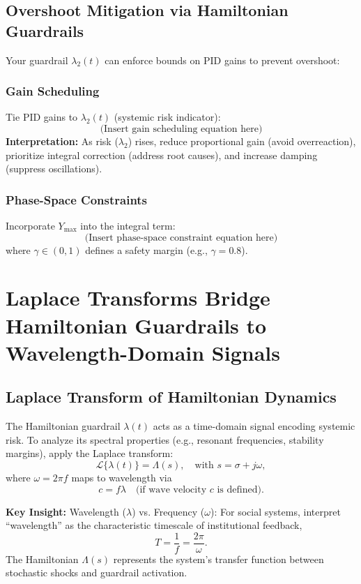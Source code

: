 \documentclass{article}
\theoremstyle{definition}
\begin{document}
\subsection{Overshoot Mitigation via Hamiltonian Guardrails}
Your guardrail $\lambda_2(t)$ can enforce bounds on PID gains to prevent overshoot:

\subsubsection{Gain Scheduling}
Tie PID gains to $\lambda_2(t)$ (systemic risk indicator):
\[
\text{(Insert gain scheduling equation here)}
\]
\textbf{Interpretation:} As risk ($\lambda_2$) rises, reduce proportional gain (avoid overreaction), prioritize integral correction (address root causes), and increase damping (suppress oscillations).

\subsubsection{Phase-Space Constraints}
Incorporate $Y_{\text{max}}$ into the integral term:
\[
\text{(Insert phase-space constraint equation here)}
\]
where $\gamma \in (0,1)$ defines a safety margin (e.g., $\gamma = 0.8$).


\section{Laplace Transforms Bridge Hamiltonian Guardrails to Wavelength-Domain Signals}

\subsection{Laplace Transform of Hamiltonian Dynamics}
The Hamiltonian guardrail $\lambda(t)$ acts as a time-domain signal encoding systemic risk. To analyze its spectral properties (e.g., resonant frequencies, stability margins), apply the Laplace transform:
\[
\mathcal{L}\{\lambda(t)\} = \Lambda(s), \quad \text{with } s = \sigma + j\omega,
\]
where $\omega = 2\pi f$ maps to wavelength via
\[
c = f \lambda \quad \text{(if wave velocity $c$ is defined)}.
\]

\textbf{Key Insight:} Wavelength ($\lambda$) vs. Frequency ($\omega$): For social systems, interpret ``wavelength'' as the characteristic timescale of institutional feedback,
\[
T = \frac{1}{f} = \frac{2\pi}{\omega}.
\]
The Hamiltonian $\Lambda(s)$ represents the system’s transfer function between stochastic shocks and guardrail activation.
\end{document}

